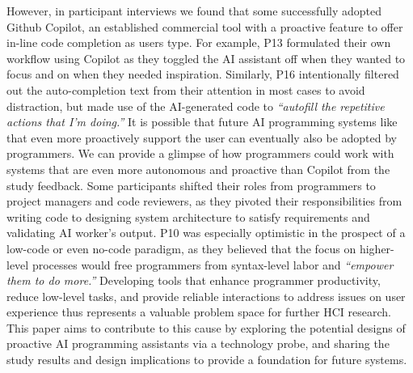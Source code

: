 However, in participant interviews we found that some successfully adopted Github Copilot, an established commercial tool with a proactive feature to offer in-line code completion as users type.
For example, P13 formulated their own workflow using Copilot as they toggled the AI assistant off when they wanted to focus and on when they needed inspiration.
Similarly, P16 intentionally filtered out the auto-completion text from their attention in most cases to avoid distraction, but made use of the AI-generated code to \textit{``autofill the repetitive actions that I'm doing.''}
It is possible that future AI programming systems like \sys{} that even more proactively support the user can eventually also be adopted by programmers.
We can provide a glimpse of how programmers could work with systems that are even more autonomous and proactive than Copilot from the study feedback.
Some participants shifted their roles from programmers to project managers and code reviewers, as they pivoted their responsibilities from writing code to designing system architecture to satisfy requirements and validating AI worker's output.
P10 was especially optimistic in the prospect of a low-code or even no-code paradigm, as they believed that the focus on higher-level processes would free programmers from syntax-level labor and \textit{``empower them to do more.''}
Developing tools that enhance programmer productivity, reduce low-level tasks, and provide reliable interactions to address issues on user experience thus represents a valuable problem space for further HCI research.
This paper aims to contribute to this cause by exploring the potential designs of proactive AI programming assistants via a technology probe, and sharing the study results and design implications to provide a foundation for future systems.



